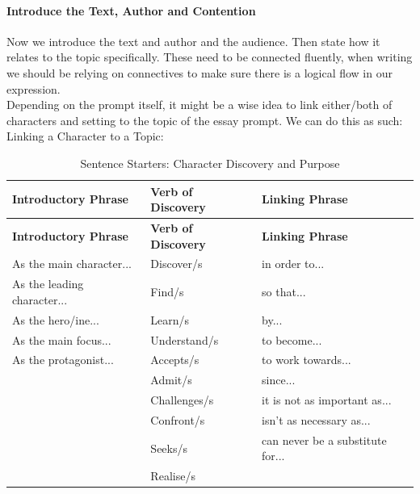 \documentclass[a4paper]{article}
\begin{document}
\paragraph{Introduce the Text, Author and Contention}
Now we introduce the text and author and the audience. Then state how it relates to the topic specifically. These need to be connected fluently, when writing we should be relying on connectives to make sure there is a logical flow in our expression.\\

Depending on the prompt itself, it might be a wise idea to link either/both of characters and setting to the topic of the essay prompt. We can do this as such:\\

Linking a Character to a Topic:
\begin{longtable}{|p{4.5cm}|p{4cm}|p{6cm}|}
\caption{Sentence Starters: Character Discovery and Purpose} \label{tab:discoveryphrases} \\
\hline
\textbf{Introductory Phrase} & \textbf{Verb of Discovery} & \textbf{Linking Phrase} \\
\hline
\endfirsthead

\hline
\textbf{Introductory Phrase} & \textbf{Verb of Discovery} & \textbf{Linking Phrase} \\
\hline
\endhead

\hline
\endfoot

As the main character...    & Discover/s    & in order to... \\
As the leading character... & Find/s        & so that... \\
As the hero/ine...          & Learn/s       & by... \\
As the main focus...        & Understand/s  & to become... \\
As the protagonist...       & Accepts/s     & to work towards... \\
                            & Admit/s       & since... \\
                            & Challenges/s  & it is not as important as... \\
                            & Confront/s    & isn't as necessary as... \\
                            & Seeks/s       & can never be a substitute for... \\
                            & Realise/s     & \\
\hline

\end{longtable}
\end{document}
